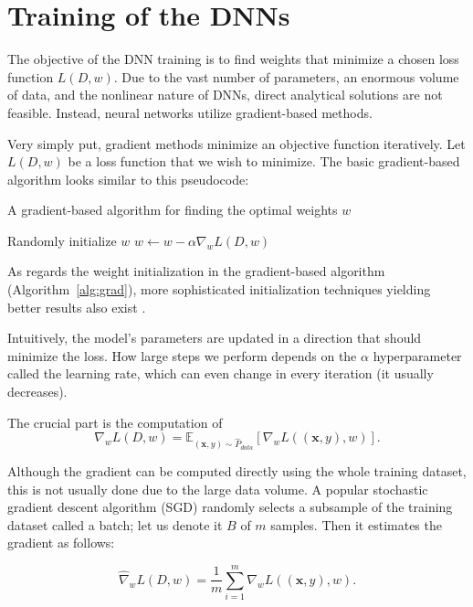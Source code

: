 \section{Training of the DNNs}

The objective of the DNN training is to find weights that minimize a chosen loss function $L(D, w)$. Due to the vast number of parameters, an enormous volume of data, and the nonlinear nature of DNNs, direct analytical solutions are not feasible. Instead, neural networks utilize gradient-based methods.

Very simply put, gradient methods minimize an objective function iteratively. Let $L(D, w)$ be a loss function that we wish to minimize. The basic gradient-based algorithm looks similar to this pseudocode:


\begin{algorithm}[H]
\begin{algorithmic}
	\caption{A gradient-based algorithm for finding the optimal weights $w$}\label{alg:grad}
	\State Randomly initialize $w$
		\State $w \gets w - \alpha \nabla_w L(D, w)$
	\EndWhile
\end{algorithmic}
\end{algorithm}

As regards the weight initialization in the gradient-based algorithm (Algorithm~\ref{alg:grad}), more sophisticated initialization techniques yielding better results also exist \citep{glorot2010understanding}.

Intuitively, the model’s parameters are updated in a direction that should minimize the loss. How large steps we perform depends on the $\alpha$ hyperparameter called the learning rate, which can even change in every iteration (it usually decreases).

The crucial part is the computation of
\begin{equation}
	\nabla_w L(D, w) = \mathbb{E}_{(\textbf{x}, y) \sim \hat{P}_{data}} [ \nabla_w L((\textbf{x}, y), w) ].
\end{equation}

Although the gradient can be computed directly using the whole training dataset, this is not usually done due to the large data volume. A popular stochastic gradient descent algorithm (SGD) \citep{kiefer1952stochastic} randomly selects a subsample of the training dataset called a batch; let us denote it $B$ of $m$ samples. Then it estimates the gradient as follows:

\begin{equation}
	\hat{\nabla}_w L(D, w) = \frac{1}{m} \sum_{i=1}^m \nabla_w L((\textbf{x}, y), w).
\end{equation}
 

